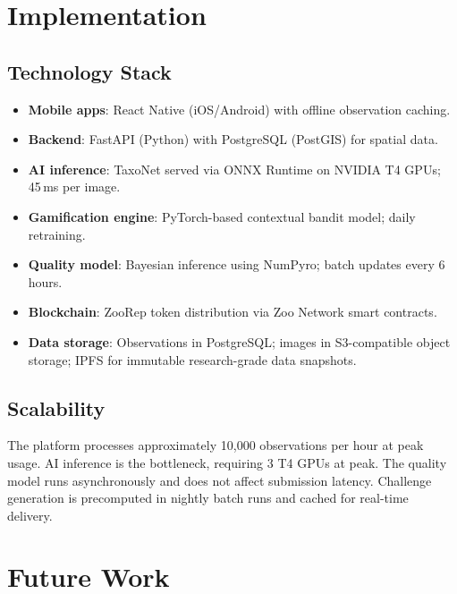 \documentclass[11pt,a4paper]{article}
\begin{document}
\section{Implementation}
\label{sec:implementation}

\subsection{Technology Stack}

\begin{itemize}
  \item \textbf{Mobile apps}: React Native (iOS/Android) with offline
    observation caching.
  \item \textbf{Backend}: FastAPI (Python) with PostgreSQL (PostGIS) for
    spatial data.
  \item \textbf{AI inference}: TaxoNet served via ONNX Runtime on
    NVIDIA T4 GPUs; 45\,ms per image.
  \item \textbf{Gamification engine}: PyTorch-based contextual bandit
    model; daily retraining.
  \item \textbf{Quality model}: Bayesian inference using NumPyro;
    batch updates every 6 hours.
  \item \textbf{Blockchain}: ZooRep token distribution via Zoo Network
    smart contracts.
  \item \textbf{Data storage}: Observations in PostgreSQL; images in
    S3-compatible object storage; IPFS for immutable research-grade
    data snapshots.
\end{itemize}

\subsection{Scalability}

The platform processes approximately 10{,}000 observations per hour at
peak usage. AI inference is the bottleneck, requiring 3 T4 GPUs at peak.
The quality model runs asynchronously and does not affect submission
latency. Challenge generation is precomputed in nightly batch runs and
cached for real-time delivery.


\section{Future Work}
\label{sec:future}
\end{document}
